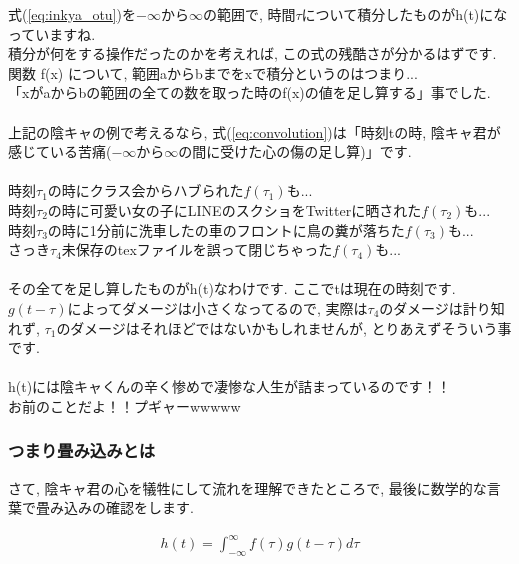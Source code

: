 \documentclass[11pt,a4paper]{jreport}
\begin{document}
式(\ref{eq:inkya_otu})を$-\infty$から$\infty$の範囲で, 時間$\tau$について積分したものがh(t)になっていますね.\\
積分が何をする操作だったのかを考えれば, この式の残酷さが分かるはずです.\\
関数 f(x) について, 範囲aからbまでをxで積分というのはつまり...\\
「xがaからbの範囲の全ての数を取った時のf(x)の値を足し算する」事でした. \\
\\
上記の陰キャの例で考えるなら, 式(\ref{eq:convolution})は「時刻tの時, 陰キャ君が感じている苦痛($-\infty$から$\infty$の間に受けた心の傷の足し算)」です.\\
\\
時刻$\tau_1$の時にクラス会からハブられた$f(\tau_1)$も...\\
時刻$\tau_2$の時に可愛い女の子にLINEのスクショをTwitterに晒された$f(\tau_2)$も...\\
時刻$\tau_3$の時に1分前に洗車したの車のフロントに鳥の糞が落ちた$f(\tau_3)$も...\\
さっき$\tau_4$未保存のtexファイルを誤って閉じちゃった$f(\tau_4)$も...\\
\\
その全てを足し算したものがh(t)なわけです. ここでtは現在の時刻です. \\
$g(t-\tau)$によってダメージは小さくなってるので, 実際は$\tau_4$のダメージは計り知れず, $\tau_1$のダメージはそれほどではないかもしれませんが, とりあえずそういう事です. \\
\\
h(t)には陰キャくんの辛く惨めで凄惨な人生が詰まっているのです！！\\
お前のことだよ！！プギャーwwwww



\subsubsection{つまり畳み込みとは}
さて, 陰キャ君の心を犠牲にして流れを理解できたところで, 最後に数学的な言葉で畳み込みの確認をします.

\begin{eqnarray}
\label{eq:conv}
h(t) = \int^{\infty}_{-\infty} f(\tau) g(t - \tau) d\tau
\end{eqnarray}
\end{document}

